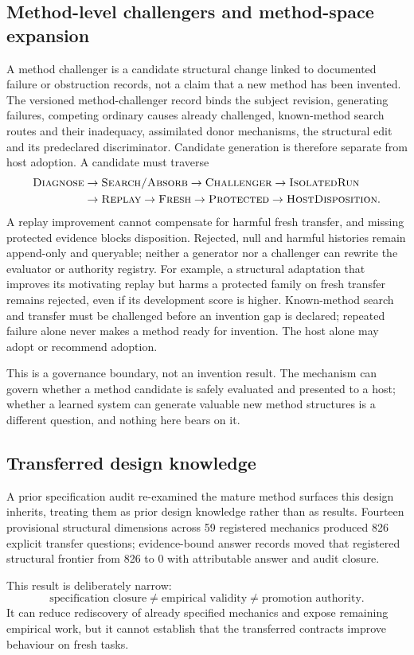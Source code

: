 \subsection{Method-level challengers and method-space expansion}
A method challenger is a candidate structural change linked to documented failure or obstruction records, not a claim that a new method has been invented. The versioned method-challenger record binds the subject revision, generating failures, competing ordinary causes already challenged, known-method search routes and their inadequacy, assimilated donor mechanisms, the structural edit and its predeclared discriminator. Candidate generation is therefore separate from host adoption. A candidate must traverse
\[
\begin{aligned}
\textsc{Diagnose}&\rightarrow\textsc{Search/Absorb}\rightarrow\textsc{Challenger}\rightarrow\textsc{IsolatedRun}\\
&\rightarrow\textsc{Replay}\rightarrow\textsc{Fresh}\rightarrow\textsc{Protected}\rightarrow\textsc{HostDisposition}.
\end{aligned}
\]
A replay improvement cannot compensate for harmful fresh transfer, and missing protected evidence blocks disposition. Rejected, null and harmful histories remain append-only and queryable; neither a generator nor a challenger can rewrite the evaluator or authority registry. For example, a structural adaptation that improves its motivating replay but harms a protected family on fresh transfer remains rejected, even if its development score is higher. Known-method search and transfer must be challenged before an invention gap is declared; repeated failure alone never makes a method ready for invention. The host alone may adopt or recommend adoption.

This is a governance boundary, not an invention result. The mechanism can govern whether a method candidate is safely evaluated and presented to a host; whether a learned system can generate valuable new method structures is a different question, and nothing here bears on it.

\subsection{Transferred design knowledge}

A prior specification audit re-examined the mature method surfaces this design inherits, treating them as prior design knowledge rather than as results. Fourteen provisional structural dimensions across 59 registered mechanics produced 826 explicit transfer questions; evidence-bound answer records moved that registered structural frontier from 826 to 0 with attributable answer and audit closure.

This result is deliberately narrow:
\[
\text{specification closure}\neq\text{empirical validity}\neq\text{promotion authority}.
\]
It can reduce rediscovery of already specified mechanics and expose remaining empirical work, but it cannot establish that the transferred contracts improve behaviour on fresh tasks.

